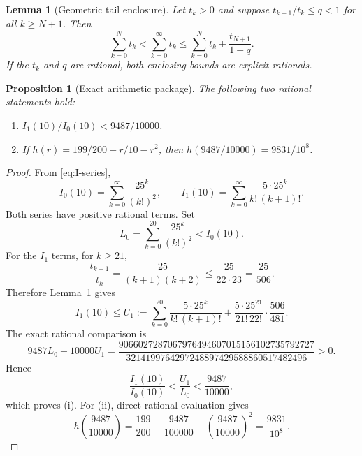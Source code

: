 \documentclass[10pt,a4paper]{amsart}
\newtheorem{lemma}{Lemma}
\newtheorem{proposition}{Proposition}
\begin{document}
\begin{lemma}[Geometric tail enclosure]\label{lem:tail}
Let \(t_k>0\) and suppose \(t_{k+1}/t_k\le q<1\) for all \(k\ge N+1\). Then
\begin{equation}\label{eq:tail-enclosure}
\sum_{k=0}^{N}t_k<\sum_{k=0}^{\infty}t_k
\le\sum_{k=0}^{N}t_k+\frac{t_{N+1}}{1-q}.
\end{equation}
If the \(t_k\) and \(q\) are rational, both enclosing bounds are explicit
rationals.
\end{lemma}

\begin{proposition}[Exact arithmetic package]\label{prop:certificate-arithmetic}
The following two rational statements hold:
\begin{enumerate}[label=\textup{(\roman*)},leftmargin=2.3em]
\item \(I_1(10)/I_0(10)<9487/10000\).
\item If \(h(r)=199/200-r/10-r^2\), then
\(h(9487/10000)=9831/10^8\).
\end{enumerate}
\end{proposition}

\begin{proof}
From \eqref{eq:I-series},
\begin{equation}\label{eq:appendix-bessel-series}
I_0(10)=\sum_{k=0}^{\infty}\frac{25^k}{(k!)^2},
\qquad
I_1(10)=\sum_{k=0}^{\infty}\frac{5\cdot25^k}{k!\,(k+1)!}.
\end{equation}
Both series have positive rational terms. Set
\begin{equation}\label{eq:appendix-L0}
L_0=\sum_{k=0}^{20}\frac{25^k}{(k!)^2}<I_0(10).
\end{equation}
For the \(I_1\) terms, for \(k\ge21\),
\begin{equation}\label{eq:appendix-tail-ratio}
\frac{t_{k+1}}{t_k}
=\frac{25}{(k+1)(k+2)}
\le \frac{25}{22\cdot23}
=\frac{25}{506}.
\end{equation}
Therefore Lemma~\ref{lem:tail} gives
\begin{equation}\label{eq:appendix-U1}
I_1(10)\le U_1:=
\sum_{k=0}^{20}\frac{5\cdot25^k}{k!\,(k+1)!}
+\frac{5\cdot25^{21}}{21!\,22!}\cdot\frac{506}{481}.
\end{equation}
The exact rational comparison is
\begin{equation}\label{eq:appendix-integer-witness}
9487L_0-10000U_1
=
\frac{9066027287067976494607015156102735792727}
{3214199764297248897429588860517482496}>0.
\end{equation}
Hence
\begin{equation}\label{eq:appendix-ratio-certificate}
\frac{I_1(10)}{I_0(10)}
<\frac{U_1}{L_0}
<\frac{9487}{10000},
\end{equation}
which proves (i). For (ii), direct rational evaluation gives
\begin{equation}\label{eq:appendix-h-value}
h\!\left(\frac{9487}{10000}\right)
=\frac{199}{200}-\frac{9487}{100000}
-\left(\frac{9487}{10000}\right)^2
=\frac{9831}{10^8}.
\end{equation}
\end{proof}
\end{document}
